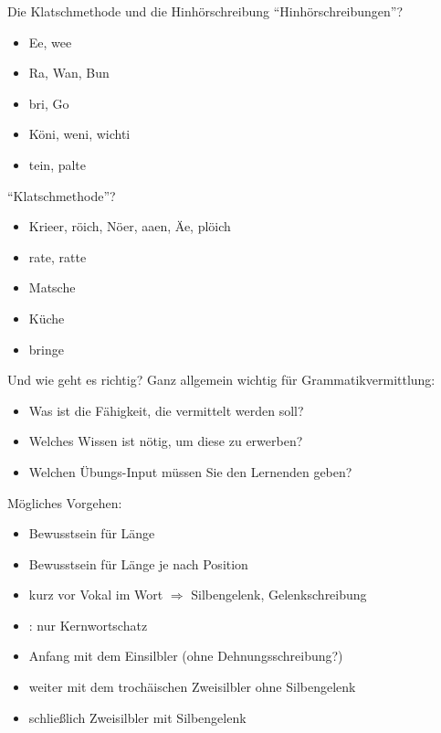 \begin{frame}
  {Die Klatschmethode und die Hinhörschreibung}
  \pause
  "`Hinhörschreibungen"'?\\
  \begin{itemize}[<+->]
    \item Ee, wee
    \item Ra, Wan, Bun
    \item bri, Go
    \item Köni, weni, wichti
    \item {}tein, palte
  \end{itemize}
  \pause
  "`Klatschmethode"'?\\
  \begin{itemize}[<+->]
    \item Krieer, röich, Nöer, aaen, Äe, plöich
    \item rate, ratte
    \item Matsche
    \item Küche
    \item bringe
  \end{itemize}
\end{frame}


\begin{frame}
  {Und wie geht es richtig?}
  \pause
  \Halbzeile
  Ganz allgemein wichtig für Grammatikvermittlung:\\
 \Halbzeile 
 \pause
 \begin{itemize}[<+->]
    \item Was ist die \alert{Fähigkeit}, die vermittelt werden soll?
    \item Welches \alert{Wissen} ist nötig, um diese zu erwerben?
    \item Welchen \alert{Übungs-Input} müssen Sie den Lernenden geben?
  \end{itemize}
 \Halbzeile
 \pause
  Mögliches Vorgehen:
  \pause
  \begin{itemize}[<+->]
    \item \alert{Bewusstsein für Länge}
    \item Bewusstsein für \alert{Länge je nach Position}
    \item kurz vor Vokal im Wort $\Rightarrow$ Silbengelenk, Gelenkschreibung
    \item {}: \alert{nur Kernwortschatz}
    \item Anfang mit dem \alert{Einsilbler} (ohne Dehnungsschreibung?)
    \item weiter mit dem \alert{trochäischen Zweisilbler ohne Silbengelenk}
    \item schließlich \alert{Zweisilbler mit Silbengelenk}
  \end{itemize}
\end{frame}

